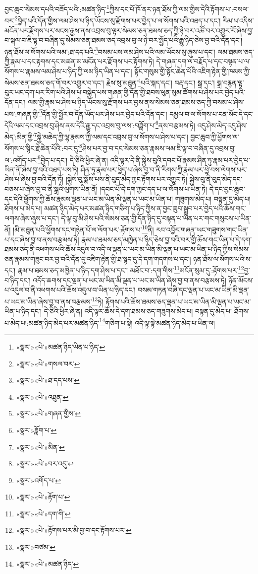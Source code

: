 བྱང་ཆུབ་སེམས་དཔའི་བཟོད་པའི་:མཚན་ཉིད་\footnote{«སྣར་»«པེ་»མཚན་ཉིད་ཡིན་པ་ཉིད་}ཀྱིས་དང་པོ་ཁོ་ནར་ཉན་ཐོས་ཀྱི་ལམ་གྱིས་དེའི་རྟོགས་པ་:བསལ་བར་\footnote{«སྣར་»«པེ་»གསལ་བར་}བྱེད་པའི་དོན་གྱིས་ལམ་ཤེས་པ་ཉིད་ཡོངས་སུ་རྫོགས་པར་བྱེད་པ་ལ་སོགས་པའི་འཐད་པ་དང་། རིམ་པ་འདིས་མངོན་པར་རྫོགས་པར་སངས་རྒྱས་ནས་འབྲས་བུ་ལྟར་སེམས་ཅན་ཐམས་ཅད་ཀྱི་ཉེ་བར་འཚོ་བར་འགྱུར་རོ་ཞེས་བྱ་བ་སྐལ་བ་ཇི་ལྟ་བ་བཞིན་དུ་སེམས་ཅན་ཐམས་ཅད་འབྲས་བུ་ལ་ཉེ་བར་སྤྱོད་པའི་རྒྱུ་ཉིད་ཅེས་བྱ་བའི་དོན་དང་། ཉན་ཐོས་ལ་སོགས་པའི་ལམ་:ཐ་དད་པའི་\footnote{«སྣར་»«པེ་»ཐ་དད་པས་}བསམ་པས་ལམ་ཤེས་པའི་ལམ་ཡོངས་སུ་ཞུས་པ་དང་། ལམ་ཐམས་ཅད་ཀྱི་རྣམ་པ་དང་རྟགས་དང་མཚན་མ་མངོན་པར་རྫོགས་པར་རྟོགས་ཏེ། དེ་གཞན་དག་ལ་བརྗོད་པ་དང་བསྟན་པ་ལ་སོགས་པ་རྣམས་ལམ་ཤེས་པ་ཉིད་ཀྱི་ལམ་ཉིད་ཡིན་པ་དང་། སྟོང་གསུམ་གྱི་སྟོང་ཆེན་པོའི་འཇིག་རྟེན་གྱི་ཁམས་ཀྱི་སེམས་ཅན་ཐམས་ཅད་གོ་བར་འགྱུར་བ་དང་། རྗེས་སུ་མཐུན་\footnote{«སྣར་»«པེ་»འཐུན་}པའི་སྐད་དང་། བརྡ་དང་། སྒྲ་དང་། སྒྲ་བརྙན་ལྟ་བུར་ཡང་དག་པར་རིག་པའི་ཤེས་པ་བསྐྱེད་པས་གཞན་གྱི་དོན་གྱི་ཐབས་ཕུན་སུམ་ཚོགས་པ་ཤེས་པར་བྱེད་པའི་དོན་དང་། ལམ་གྱི་རྣམ་པ་ཤེས་པ་ཉིད་ཡོངས་སུ་རྫོགས་པར་བྱས་ནས་སེམས་ཅན་ཐམས་ཅད་ཀྱི་བསམ་པ་ཤེས་པས་:གཞན་གྱི་\footnote{«སྣར་»«པེ་»གཞན་གྱིས་}དོན་གྱི་སྦྱོར་བ་དོན་ཡོད་པར་ཤེས་པར་བྱེད་པའི་དོན་དང་། དམྱལ་བ་ལ་སོགས་པ་ངན་སོང་དེ་དང་དེའི་ལམ་དང་འབྲས་བུ་ཤེས་ནས་དེའི་རྒྱུ་དང་འབྲས་བུ་ལས་:བཟློག་པ་\footnote{«སྣར་»ཟློག་པ་}ནས་བརྩམས་ཏེ། འདུ་ཤེས་མེད་འདུ་ཤེས་མེད་:མིན་གྱི་\footnote{«སྣར་»«པེ་»མིན་}སྐྱེ་མཆེད་ཀྱི་ལྷ་རྣམས་ཀྱི་ལམ་དང་འབྲས་བུ་ལ་སོགས་པ་ཤེས་པ་དང་། བྱང་ཆུབ་ཀྱི་ཕྱོགས་ལ་སོགས་པ་སྙིང་རྗེ་ཆེན་པོའི་:བར་དུ་\footnote{«སྣར་»«པེ་»བར་འདུ་}ཤེས་པར་བྱ་བ་དང་སེམས་ཅན་རྣམས་ལམ་ཇི་ལྟ་བ་བཞིན་དུ་འབྲས་བུ་ལ་:འགོད་པར་\footnote{«སྣར་»འགོད་པ་}བྱེད་པ་དང་། དེ་ཅིའི་ཕྱིར་ཞེ་ན། འདི་ལྟར་དེ་ནི་སྐྱེས་བུའི་དབང་པོ་རྣམས་ཤིན་ཏུ་རྣམ་པར་བྱེད་པ་ཡིན་ནོ་ཞེས་བྱ་བའི་འཐད་པས་ཏེ། ཤིན་ཏུ་རྣམ་པར་ཕྱེད་པ་ཞེས་བྱ་བ་ནི་རིགས་ཀྱི་རྣམ་པར་ཕྱེ་བས་ལེགས་པར་ཤེས་པ་ཞེས་བྱ་བའི་དོན་ཏོ། །སྐྱེས་བུ་སྨོས་པས་ནི་བུད་མེད་ཀྱང་རྟོགས་པར་འགྱུར་ཏེ། སྐྱེས་བུ་ནི་བུད་མེད་དང་བཅས་པ་ཞེས་བྱ་བ་ནི་སྒྲའི་ལུགས་ཡིན་ནོ། །དབང་པོ་དེ་དག་ཀྱང་དད་པ་ལ་སོགས་པ་ཡིན་ཏེ། དེ་དང་བྱང་ཆུབ་དང་དེའི་ཕྱོགས་ཀྱི་ཆོས་རྣམས་ལྡན་པ་ཡང་མ་ཡིན་མི་ལྡན་པ་ཡང་མ་ཡིན་པ། གཟུགས་མེད་པ། བསྟན་དུ་མེད་པ། ཐོགས་པ་མེད་པ། མཚན་ཉིད་མེད་པར་མཚན་ཉིད་གཅིག་པ་ཉིད་ཀྱིས་ན་བྱང་ཆུབ་སྒྲུབ་པར་བྱེད་པའི་ཆོས་གང་ལགས་ཞེས་ཞུས་པ་དང་། དེ་ལྟ་བུ་མི་ཤེས་པའི་སེམས་ཅན་གྱི་དོན་ཉིད་དུ་བསྟན་པ་ཡིན་པར་གང་གསུངས་པ་ཡིན་ནོ། །མི་མཐུན་པའི་ཕྱོགས་དང་གཉེན་པོ་ལ་ལོག་པར་:རྟོགས་པ་\footnote{«སྣར་»«པེ་»རྟོག་པ་}ནི། རབ་འབྱོར་གཞན་ཡང་གཟུགས་གང་ཡིན་པ་དང་ཞེས་བྱ་བ་ནས་བརྩམས་ཏེ། རྣམ་པ་ཐམས་ཅད་མཁྱེན་པ་ཉིད་ཅེས་བྱ་བའི་བར་གྱི་ཆོས་གང་ཡིན་པ་དེ་དག་ཐམས་ཅད་ནི་འཕགས་པའི་ཆོས་འདུལ་བ་འདི་ལ་ལྡན་པ་ཡང་མ་ཡིན་མི་ལྡན་པ་ཡང་མ་ཡིན་པ་ཉིད་ཀྱིས་སེམས་ཅན་རྣམས་གཟུང་བར་བྱ་བའི་དོན་དུ་འཇིག་རྟེན་གྱི་ཐ་སྙད་དུ་དེ་དག་གདགས་པ་དང་། ཉན་ཐོས་ལ་སོགས་པའི་ས་དང་། རྣམ་པ་ཐམས་ཅད་མཁྱེན་པ་ཉིད་དག་ཤེས་པ་དང་། མཐོང་བ་:དག་གིས་\footnote{«སྣར་»«པེ་»དག་གི་}མངོན་སུམ་དུ་:རྟོགས་པར་\footnote{«སྣར་»«པེ་»རྟོགས་པར་མི་བྱ་བ་དང་རྟོགས་པར་}བྱ་བ་ཉིད་དང་། འདོད་ཆགས་དང་ལྡན་པ་ཡང་མ་ཡིན་མི་ལྡན་པ་ཡང་མ་ཡིན་ཞེས་བྱ་བ་ནས་བརྩམས་ཏེ། ཉོན་མོངས་པ་འདུལ་བ་ནི་འཕགས་པའི་ཆོས་འདུལ་བ་ཡིན་པ་ཉིད་དང་། བསམ་གཏན་བཞི་དང་ལྡན་པ་ཡང་མ་ཡིན་མི་ལྡན་པ་ཡང་མ་ཡིན་ཞེས་བྱ་བ་ནས་བརྩམས་\footnote{«སྣར་»བཙམ་}ཏེ། རྟོགས་པའི་ཆོས་ཐམས་ཅད་ལྡན་པ་ཡང་མ་ཡིན་མི་ལྡན་པ་ཡང་མ་ཡིན་པ་ཉིད་དང་། དེ་ཅིའི་ཕྱིར་ཞེ་ན། འདི་ལྟར་ཆོས་དེ་དག་ཐམས་ཅད་གཟུགས་མེད་པ། བསྟན་དུ་མེད་པ། ཐོགས་པ་མེད་པ།:མཚན་ཉིད་མེད་པར་མཚན་ཉིད་\footnote{«སྣར་»«པེ་»མཚན་ཉིད་}གཅིག་པ་སྟེ། འདི་ལྟ་སྟེ་མཚན་ཉིད་མེད་པ་ཡིན་ལ། 
